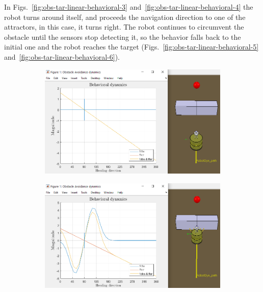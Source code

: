 In Figs.~\ref{fig:obs-tar-linear-behavioral-3}
and~\ref{fig:obs-tar-linear-behavioral-4} the robot turns around itself, and
proceeds the navigation direction to one of the attractors, in this case, it
turns right.
The robot continues to circumvent the obstacle until the sensors stop detecting
it, so the behavior falls back to the initial one and the robot reaches the
target (Figs.~\ref{fig:obs-tar-linear-behavioral-5} and~\ref{fig:obs-tar-linear-behavioral-6}).

\begin{figure}[htb!]
  \centering
  \begin{subfigure}{.45\textwidth}
  \includegraphics[width=\textwidth]{img/4-1.PNG}%
  \caption{}%
%
  \label{fig:obs-tar-linear-behavioral-1}
  \end{subfigure}
  \begin{subfigure}{.45\textwidth}
    \includegraphics[width=\textwidth]{img/4-2.PNG}%
  \caption{}%
  \label{fig:obs-tar-linear-behavioral-2}
  \end{subfigure}
  \begin{subfigure}{.45\textwidth}

\end{subfigure}
\end{figure}
